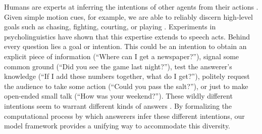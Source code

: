 \documentclass[12pt, floatsintext, jou]{apa6}
\begin{document}
Humans are experts at inferring the intentions of other agents from their actions \cite{TomaselloCarpenter___Moll05_IntentionsCulturalCognition}. Given simple motion cues, for example, we are able to reliably discern high-level goals such as chasing, fighting, courting, or playing \cite{BarrettToddMillerBlythe05_IntentionFromMotionCues, HeiderSimmel44_Animacy}. Experiments in psycholinguistics have shown that this expertise extends to speech acts.  Behind every question lies a goal or intention. This could be an intention to obtain an explicit piece of information (``Where can I get a newspaper?''), signal some common ground (``Did you see the game last night?''), test the answerer's knowledge (``If I add these numbers together, what do I get?''), politely request the audience to take some action (``Could you pass the salt?''), or just to make open-ended small talk (``How was your weekend?''). These wildly different intentions seem to warrant different kinds of answers%
. By formalizing the computational process by which answerers infer these different intentions, our model framework provides a unifying way to accommodate this diversity.  %




\end{document}
